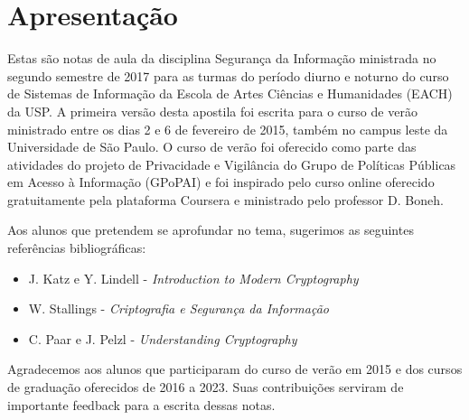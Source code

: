 ﻿\chapter*{Apresentação}

Estas são notas de aula da disciplina Segurança da Informação ministrada no segundo semestre de 2017 para as turmas do período diurno e noturno do curso de Sistemas de Informação da Escola de Artes Ciências e Humanidades (EACH) da USP.
A primeira versão desta apostila foi escrita para o curso de verão ministrado entre os dias 2 e 6 de fevereiro de 2015, também no campus leste da Universidade de São Paulo.
O curso de verão foi oferecido como parte das atividades do projeto de Privacidade e Vigilância do Grupo de Políticas Públicas em Acesso à Informação (GPoPAI) e foi inspirado pelo curso online oferecido gratuitamente pela plataforma Coursera e ministrado pelo professor D. Boneh.

Aos alunos que pretendem se aprofundar no tema, sugerimos as seguintes referências bibliográficas:

\begin{itemize}
\item J. Katz e Y. Lindell - {\em Introduction to Modern Cryptography}
\item W. Stallings - {\em Criptografia e Segurança da Informação}
\item C. Paar e J. Pelzl - {\em Understanding Cryptography}
\end{itemize}

Agradecemos aos alunos que participaram do curso de verão em 2015 e dos cursos de graduação oferecidos de 2016 a 2023. Suas contribuições serviram de importante feedback para a escrita dessas notas.


